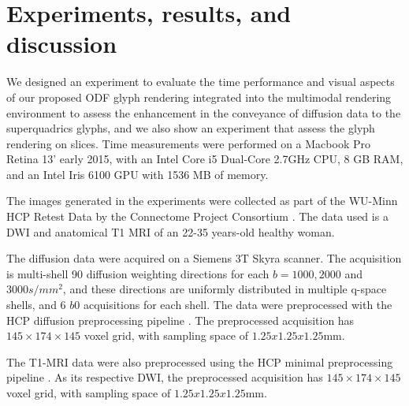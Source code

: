 \documentclass[twoside,twocolumn,10pt]{article}
\begin{document}
\section{Experiments, results, and discussion}
\label{sec::results}


We designed an experiment to evaluate the time performance and visual aspects of our proposed ODF glyph rendering integrated into the multimodal rendering environment to assess the enhancement in the conveyance of diffusion data to the superquadrics glyphs, and we also show an experiment that assess the glyph rendering on slices. Time measurements were performed on a Macbook Pro Retina 13' early 2015, with an Intel Core i5 Dual-Core 2.7GHz CPU, 8 GB RAM, and an Intel Iris 6100 GPU with 1536 MB of memory.

The images generated in the experiments were collected as part of the WU-Minn HCP Retest Data by the Connectome Project Consortium \cite{essen2012}. The data used is a DWI and anatomical T1 MRI of an 22-35 years-old healthy woman.

The diffusion data were acquired on a Siemens 3T Skyra scanner. The acquisition is multi-shell 90 diffusion weighting directions for each $b = 1000, 2000$ and $3000 s/mm^2$, and these directions are uniformly distributed in multiple q-space shells, and 6 $b0$ acquisitions for each shell. The data were preprocessed with the HCP diffusion preprocessing pipeline \cite{glasser2013}. The preprocessed acquisition has $145\times 174\times  145$ voxel grid, with sampling space of $1.25x1.25x1.25$mm.


The T1-MRI data were also preprocessed using the HCP minimal preprocessing pipeline \cite{glasser2013}. As its respective DWI, the preprocessed acquisition has $145\times 174\times  145$ voxel grid, with sampling space of $1.25x1.25x1.25$mm.
\end{document}
